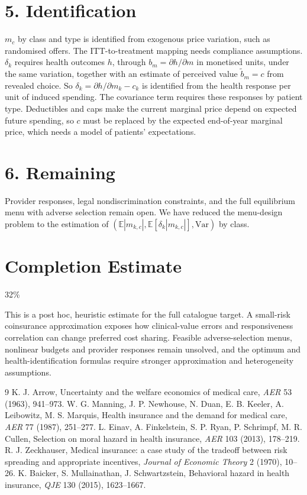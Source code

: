 \documentclass[11pt]{article}
\theoremstyle{definition}
\begin{document}
\section*{5. Identification}
$m_c$ by class and type is identified from exogenous price variation, such as randomised offers. The ITT-to-treatment
mapping needs compliance assumptions. $\delta_k$ requires health outcomes $h$, through $b_m=\partial h/\partial m$ in monetised
units, under the same variation, together with an estimate of perceived value $\tilde b_m=c$ from revealed choice. So
$\delta_k=\partial h/\partial m_k-c_k$ is identified from the health response per unit of induced spending. The covariance term
requires these responses by patient type. Deductibles and caps make the current marginal price depend on expected future
spending, so $c$ must be replaced by the expected end-of-year marginal price, which needs a model of patients' expectations.

\section*{6. Remaining}
Provider responses, legal nondiscrimination constraints, and the full equilibrium menu with adverse selection remain open.
We have reduced the menu-design problem to the estimation of $(\mathbb E|m_{k,c}|,\mathbb E[\delta_k|m_{k,c}|],\mathrm{Var})$ by class.

\section{Completion Estimate}
32\%

This is a post hoc, heuristic estimate for the full catalogue target.
A small-risk coinsurance approximation exposes how clinical-value errors and responsiveness correlation can change preferred cost sharing. Feasible adverse-selection menus, nonlinear budgets and provider responses remain unsolved, and the optimum and health-identification formulas require stronger approximation and heterogeneity assumptions.

\begin{thebibliography}{9}
 K. J. Arrow, Uncertainty and the welfare economics of medical care, \emph{AER} 53 (1963), 941--973.
 W. G. Manning, J. P. Newhouse, N. Duan, E. B. Keeler, A. Leibowitz, M. S. Marquis, Health insurance and the demand for medical care, \emph{AER} 77 (1987), 251--277.
 L. Einav, A. Finkelstein, S. P. Ryan, P. Schrimpf, M. R. Cullen, Selection on moral hazard in health insurance, \emph{AER} 103 (2013), 178--219.
 R. J. Zeckhauser, Medical insurance: a case study of the tradeoff between risk spreading and appropriate incentives, \emph{Journal of Economic Theory} 2 (1970), 10--26.
 K. Baicker, S. Mullainathan, J. Schwartzstein, Behavioral hazard in health insurance, \emph{QJE} 130 (2015), 1623--1667.
\end{thebibliography}
\end{document}
